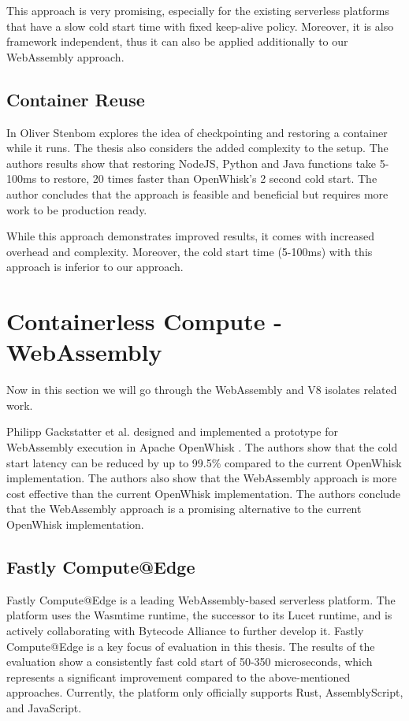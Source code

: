 This approach is very promising, especially for the existing serverless platforms that have a slow cold start time with fixed keep-alive policy. Moreover, it is also framework independent, thus it can also be applied additionally to our WebAssembly approach.

\subsection{Container Reuse}
\label{subsec:container-reuse}

In \cite{stenbom_2019_meng} Oliver Stenbom explores the idea of checkpointing and restoring a container while it runs. The thesis also considers the added complexity to the setup. The authors results show that restoring NodeJS, Python and Java functions take 5-100ms to restore, 20 times faster than OpenWhisk's 2 second cold start. The author concludes that the approach is feasible and beneficial but requires more work to be production ready.

While this approach demonstrates improved results, it comes with increased overhead and complexity. Moreover, the cold start time (5-100ms) with this approach is inferior to our approach.

\section{Containerless Compute - WebAssembly}
\label{sec:containerless}

Now in this section we will go through the WebAssembly and V8 isolates related work. 

Philipp Gackstatter et al. designed and implemented a prototype for WebAssembly execution in Apache OpenWhisk \cite{gackstatter_2022_pushing,2016_apache}. The authors show that the cold start latency can be reduced by up to 99.5\% compared to the current OpenWhisk implementation. The authors also show that the WebAssembly approach is more cost effective than the current OpenWhisk implementation. The authors conclude that the WebAssembly approach is a promising alternative to the current OpenWhisk implementation.

\subsection{Fastly Compute@Edge}
\label{subsec:fastly-compute-at-edge}

Fastly Compute@Edge \cite{fastlyinc_serverless} is a leading WebAssembly-based serverless platform. The platform uses the Wasmtime runtime, the successor to its Lucet runtime, and is actively collaborating with Bytecode Alliance to further develop it. Fastly Compute@Edge is a key focus of evaluation in this thesis. The results of the evaluation show a consistently fast cold start of 50-350 microseconds, which represents a significant improvement compared to the above-mentioned approaches. Currently, the platform only officially supports Rust, AssemblyScript, and JavaScript.

